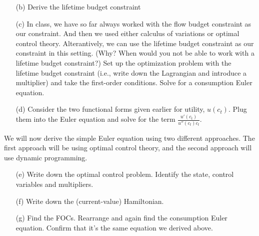 \documentclass[11pt]{extarticle}
\theoremstyle{plain}
\theoremstyle{definition}
\begin{document}
\vspace{5mm}
\begin{enumerate}
	\item [(b)] Derive the lifetime budget constraint
\end{enumerate}

\vspace{5mm}
\begin{enumerate}
	\item [(c)] In class, we have so far always worked with the flow budget constraint as our constraint. And then we used either calculus of variations or optimal control theory. Alterantively, we can use the lifetime budget constraint as our constraint in this setting. (Why? When would you not be able to work with a lifetime budget constraint?) Set up the optimization problem with the lifetime budget constraint (i.e., write down the Lagrangian and introduce a multiplier) and take the first-order conditions. Solve for a consumption Euler equation. 
\end{enumerate}

\vspace{5mm}
\begin{enumerate}
	\item [(d)] Consider the two functional forms given earlier for utility, $u(c_t)$. Plug them into the Euler equation and solve for the term $\frac{u'(c_t)}{ u''(c_t) c_t}$.
\end{enumerate}



\vspace{6mm}
\noindent
We will now derive the simple Euler equation using two different approaches. The first approach will be using optimal control theory, and the second approach will use dynamic programming.


\vspace{5mm}
\begin{enumerate}
	\item [(e)] Write down the optimal control problem. Identify the state, control variables and multipliers.
\end{enumerate}


\vspace{5mm}
\begin{enumerate}
	\item [(f)] Write down the (current-value) Hamiltonian.
\end{enumerate}

\vspace{5mm}
\begin{enumerate}
	\item [(g)] Find the FOCs. Rearrange and again find the consumption Euler equation. Confirm that it's the same equation we derived above. 
\end{enumerate}
\end{document}
